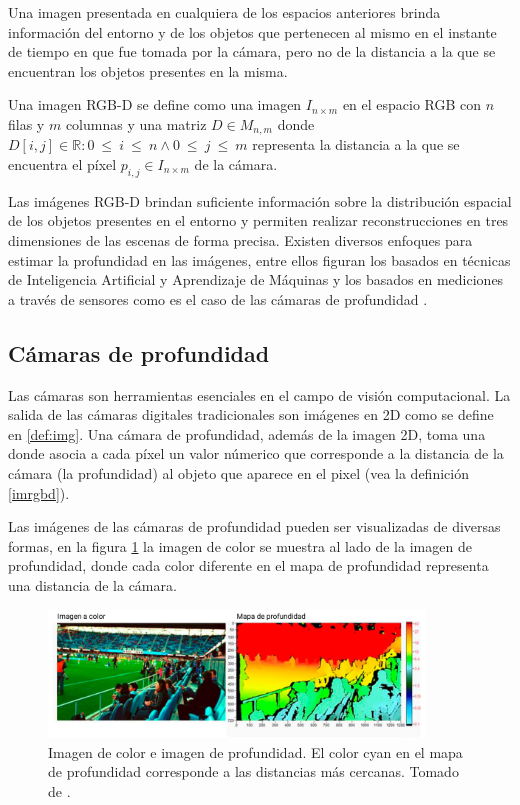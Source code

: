 Una imagen presentada en cualquiera de los espacios anteriores brinda información del entorno y de los objetos que pertenecen al mismo en el instante de tiempo en que fue tomada por la cámara, pero no de la distancia a la que se encuentran los objetos presentes en la misma. 

\begin{definition}\label{imrgbd}
	Una imagen RGB-D se define como una imagen $I_{n \times m}$ en el espacio RGB con $n$ filas y $m$ columnas y una matriz $D \in M_{n, m}$ donde $D[i, j] \in \mathbb{R}: 0~\leq~i~\leq~n \wedge 0~\leq~j~\leq~m$ representa la distancia a la que se encuentra el píxel $p_{i,j} \in I_{n \times m}$ de la cámara.
\end{definition}

Las imágenes RGB-D brindan suficiente información sobre la distribución espacial de los objetos presentes en el entorno y permiten realizar reconstrucciones en tres dimensiones de las escenas de forma precisa. Existen diversos enfoques para estimar la profundidad en las imágenes, entre ellos figuran los basados en técnicas de Inteligencia Artificial y Aprendizaje de Máquinas \cite{fu2018deep, hu2019revisiting} y los basados en mediciones a través de sensores como es el caso de las cámaras de profundidad \cite{intel}.

\subsection{Cámaras de profundidad}

Las cámaras son herramientas esenciales en el campo de visión computacional. La salida de las cámaras digitales tradicionales son imágenes en 2D como se define en \ref{def:img}. Una cámara de profundidad, además de la imagen 2D, toma una donde asocia a cada píxel un valor númerico que corresponde a la distancia de la cámara (la profundidad) al objeto que aparece en el pixel (vea la definición \ref{imrgbd}).

Las imágenes de las cámaras de profundidad pueden ser visualizadas de diversas formas, en la figura \ref{fig:rgbd} la imagen de color se muestra al lado de la imagen de profundidad, donde cada color diferente en el mapa de profundidad representa una distancia de la cámara.

\begin{figure}[ht]
	\centering
	\includegraphics[width=10cm]{./Graphics/rgbd.png}
	\caption{Imagen de color e imagen de profundidad. El color cyan en el mapa de profundidad corresponde a las distancias más cercanas. Tomado de \cite{intel}.}
	\label{fig:rgbd}
\end{figure}

